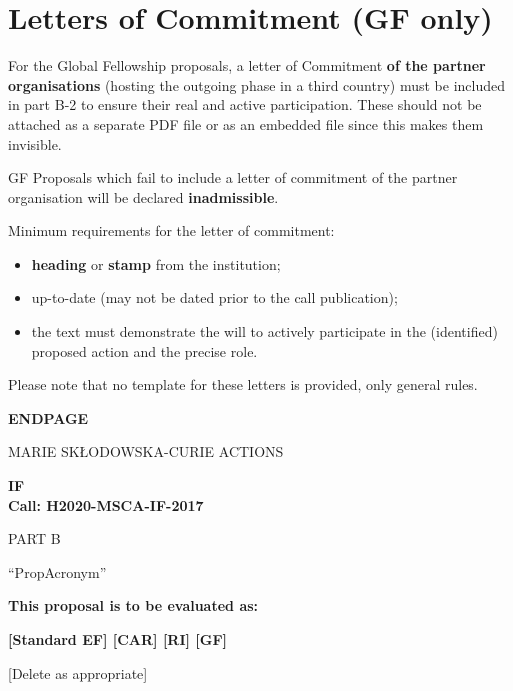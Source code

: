 \newpage
\section{Letters of Commitment (GF only)}
\label{sec:letters}

For the Global Fellowship proposals, a letter of Commitment
\textbf{of the partner organisations} (hosting the outgoing phase
in a third country) must be included in part B-2 to ensure their
real and active participation. These should not be attached as a
separate PDF file or as an embedded file since this makes them
invisible.

\medskip\noindent
GF Proposals which fail to include a letter of commitment of the
partner organisation will be declared \textbf{inadmissible}.

\medskip\noindent
Minimum requirements for the letter of commitment:
\begin{itemize}
  \item \textbf{heading} or \textbf{stamp} from the institution; 
  \item up-to-date (may not be dated prior to the call
  publication);
  \item the text must demonstrate the will to actively participate
  in the (identified) proposed action and the precise role.
\end{itemize}

\medskip\noindent
Please note that no template for these letters is provided, only
general rules.





\newpage
\label{sec:endpage}
\vspace{15mm}
\begin{center}


        \Large{
      
     
        \textbf{ENDPAGE}
  
          \vspace{15mm}
          MARIE SK\L{}ODOWSKA-CURIE ACTIONS\\
          \vspace{1cm}
          
          \textbf{\acf{IF}}\\
          \textbf{Call: H2020-MSCA-IF-2017}
          \vspace{2cm}                   

          PART B
          \vspace{2.5cm}

          ``{\sc \ac{PropAcronym}\xspace}''
          \vspace{2cm}

          \textbf{This proposal is to be evaluated as:}
          \vspace{.5cm}

          \textbf{[Standard EF] [CAR] [RI] [GF]}\\
        }
        \large{[Delete as appropriate]}

  \end{center}
\vspace{1cm}
